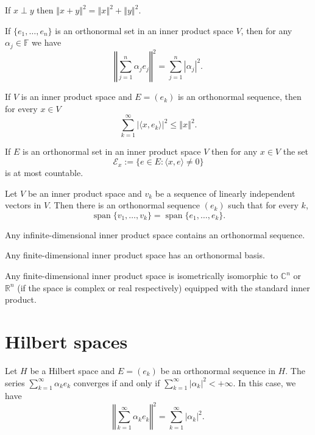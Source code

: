 \documentclass[a4paper]{article}
\newcommand{\F}{\mathbb{F}}
\newcommand{\R}{\mathbb{R}}
\renewcommand{\C}{\mathbb{C}}
\newcommand{\norm}[1]{\left\Vert #1 \right\Vert}
\newcommand{\<}{\langle}
\renewcommand{\>}{\rangle}
\renewcommand{\a}{\alpha}
\renewcommand{\span}{\operatorname{span}}
\begin{document}
\begin{thm}[Pythagoras]
  If $x\perp y$ then $\norm{x+y}^2 = \norm{x}^2 + \norm{y}^2$.
\end{thm}

\begin{lemma}
  If $\{e_1,\ldots,e_n\}$ is an orthonormal set in an inner product space $V$, then for any $\a_j\in\F$ we have
  $$\norm{\sum_{j=1}^n\a_j e_j}^2 = \sum_{j=1}^n|\a_j|^2.$$
\end{lemma}

\begin{lemma}
  If $V$ is an inner product space and $E=(e_k)$ is an orthonormal sequence, then for every $x\in V$
  $$\sum_{k=1}^\infty|\<x,e_k\>|^2\leq\norm{x}^2.$$
\end{lemma}

\begin{prop}
  If $E$ is an orthonormal set in an inner product space $V$ then for any $x\in V$ the set
  $$\mathcal{E}_x := \{e\in E: \<x,e\>\neq0\}$$
  is at most countable.
\end{prop}

\begin{lemma}
  Let $V$ be an inner product space and $v_k$ be a sequence of linearly independent vectors in $V$. Then there is an orthonormal sequence $(e_k)$ such that for every $k$,
  $$\span\{v_1,\ldots,v_k\} = \span\{e_1,\ldots,e_k\}.$$
\end{lemma}

\begin{prop}
  Any infinite-dimensional inner product space contains an orthonormal sequence.
\end{prop}

\begin{prop}
  Any finite-dimensional inner product space has an orthonormal basis.
\end{prop}

\begin{prop}
  Any finite-dimensional inner product space is isometrically isomorphic to $\C^n$ or $\R^n$ (if the space is complex or real respectively) equipped with the standard inner product.
\end{prop}

\section{Hilbert spaces}

\begin{lemma}
  Let $H$ be a Hilbert space and $E=(e_k)$ be an orthonormal sequence in $H$. The series $\sum_{k=1}^\infty \a_k e_k$ converges if and only if $\sum_{k=1}^\infty |\a_k|^2 < +\infty$. In this case, we have
  $$\norm{\sum_{k=1}^\infty \a_k e_k}^2 = \sum_{k=1}^\infty|\a_k|^2.$$
\end{lemma}
\end{document}
